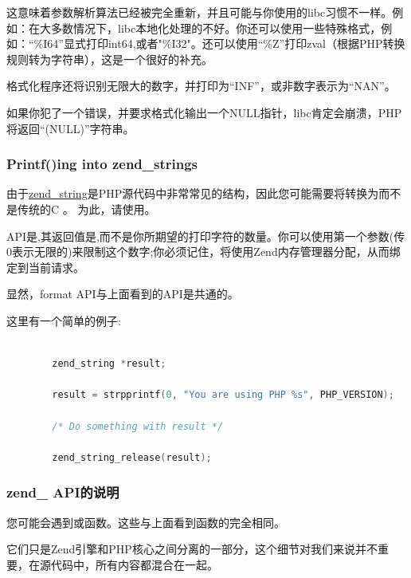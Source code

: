 这意味着参数解析算法已经被完全重新，并且可能与你使用的libc习惯不一样。例如：在大多数情况下，libc本地化处理的不好。你还可以使用一些特殊格式，例如：“\%I64”显式打印int64,或者"\%I32"。还可以使用“\%Z”打印zval（根据PHP转换规则转为字符串），这是一个很好的补充。

格式化程序还将识别无限大的数字，并打印为“INF”，或非数字表示为“NAN”。

如果你犯了一个错误，并要求格式化输出一个NULL指针，libc肯定会崩溃，PHP将返回“(NULL)”字符串。


\subsubsection{Printf()ing into zend\_strings}

由于\hyperref[sec:zend_string]{zend\_string}是PHP源代码中非常常见的结构，因此您可能需要将转换为而不是传统的C 。 为此，请使用。

API是,其返回值是,而不是你所期望的打印字符的数量。你可以使用第一个参数(传0表示无限的)来限制这个数字;你必须记住，将使用Zend内存管理器分配，从而绑定到当前请求。

显然，format API与上面看到的API是共通的。

这里有一个简单的例子:

\begin{lstlisting}[language=c]

        zend_string *result;

        result = strpprintf(0, "You are using PHP %s", PHP_VERSION);
        
        /* Do something with result */
        
        zend_string_release(result); 

\end{lstlisting}     


\subsubsection{zend\_ API的说明}

您可能会遇到或函数。这些与上面看到函数的完全相同。

它们只是Zend引擎和PHP核心之间分离的一部分，这个细节对我们来说并不重要，在源代码中，所有内容都混合在一起。


